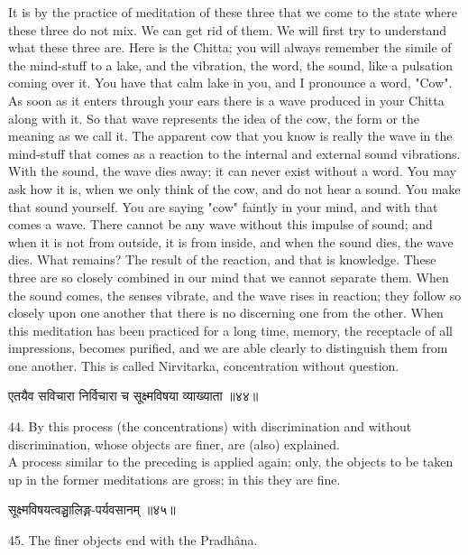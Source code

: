 It is by the practice of meditation of these three that we
come to the state where these three do not mix. We can get rid of them.
We will first try to understand what these three are. Here is the
Chitta; you will always remember
the simile of the mind-stuff to a lake, and the vibration, the word,
the sound, like a pulsation coming over it. You have that calm lake in
you, and I pronounce a word, "Cow". As soon as it enters through your
ears there is a wave produced in your Chitta along with it. So that
wave represents the idea of the cow, the form or the meaning as we call
it. The apparent cow that you know is really the wave in the mind-stuff
that comes as a reaction to the internal and external sound vibrations.
With the sound, the wave dies away; it can never exist without a word.
You may ask how it is, when we only think of the cow, and do not hear a
sound. You make that sound yourself. You are saying "cow" faintly in
your mind, and with that comes a wave. There cannot be any wave without
this impulse of sound; and when it is not from outside, it is from
inside, and when the sound dies, the wave dies. What remains? The
result of the reaction, and that is knowledge. These three are so
closely combined in our mind that we cannot separate them. When the
sound comes, the senses vibrate, and the wave rises in reaction; they
follow so closely upon one another that there is no discerning one from
the other. When this meditation has been practiced for a long time,
memory, the receptacle of all impressions, becomes purified, and we are
able clearly to distinguish them from one another. This is called
Nirvitarka, concentration without question. \\

\begin{center}
\begin{sanskrit}
एतयैव सविचारा निर्विचारा च सूक्ष्मविषया
व्याख्याता ॥४४॥
\end{sanskrit}
\end{center}
44. By this process (the concentrations) with discrimination
and without discrimination, whose objects are finer, are (also)
explained. \\

A process similar to the preceding is applied again; only, the
objects to be taken up in the former meditations are gross; in this
they are fine. \\

\begin{center}
\begin{sanskrit}
सूक्ष्मविषयत्वञ्चालिङ्ग-पर्यवसानम् ॥४५॥
\end{sanskrit}
\end{center}
45. The finer objects end with the Pradhâna. \\

